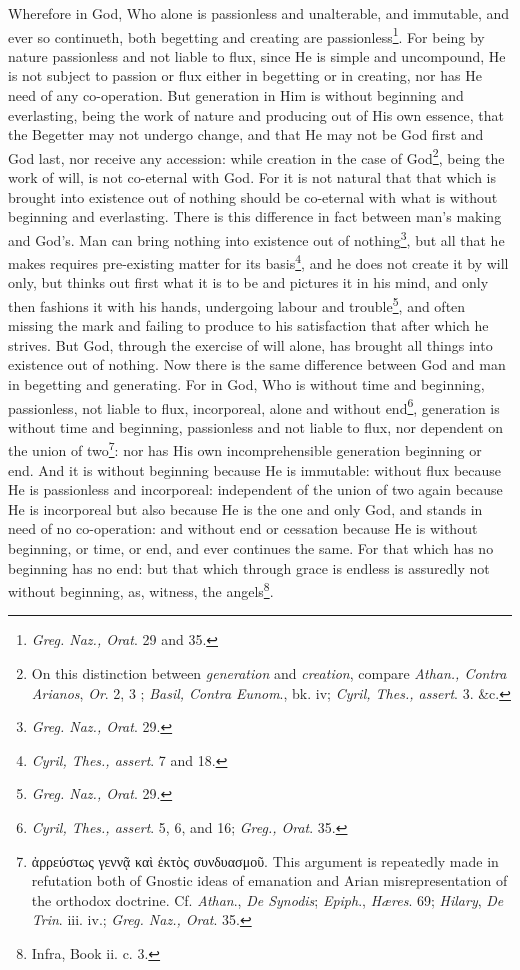 Wherefore in God, Who alone is passionless and unalterable, and immutable, and ever so continueth, both begetting and creating are passionless\footnote{\emph{Greg. Naz., Orat}. 29 and 35.}. For being by nature passionless and not liable to flux, since He is simple and uncompound, He is not subject to passion or flux either in begetting or in creating, nor has He need of any co-operation. But generation in Him is without beginning and everlasting, being the work of nature and producing out of His own essence, that the Begetter may not undergo change, and that He may not be God first and God last, nor receive any accession: while creation in the case of God\footnote{On this distinction between \emph{generation }and \emph{creation}, compare \emph{Athan., Contra Arianos}, \emph{Or}. 2, 3 ; \emph{Basil, Contra Eunom}., bk. iv; \emph{Cyril, Thes., assert}. 3. \&c.}, being the work of will, is not co-eternal with God. For it is not natural that that which is brought into existence out of nothing should be co-eternal with what is without beginning and everlasting. There is this difference in fact between man’s making and God’s. Man can bring nothing into existence out of nothing\footnote{\emph{Greg. Naz., Orat}. 29.}, but all that he makes requires pre-existing matter for its basis\footnote{\emph{Cyril, Thes., assert}. 7 and 18.}, and he does not create it by will only, but thinks out first what it is to be and pictures it in his mind, and only then fashions it with his hands, undergoing labour and trouble\footnote{\emph{Greg. Naz., Orat}. 29.}, and often missing the mark and failing to produce to his satisfaction that after which he strives. But God, through the exercise of will alone, has brought all things into existence out of nothing. Now there is the same difference between God and man in begetting and generating. For in God, Who is without time and beginning, passionless, not liable to flux, incorporeal, alone and without end\footnote{\emph{Cyril, Thes., assert}. 5, 6, and 16; \emph{Greg., Orat}. 35.}, generation is without time and beginning, passionless and not liable to flux, nor dependent on the union of two\footnote{\textgreek{ἀρρεύστως γεννᾷ καὶ ἐκτὸς συνδυασμοῦ}. This argument is repeatedly made in refutation both of Gnostic ideas of emanation and Arian misrepresentation of the orthodox doctrine. Cf. \emph{Athan}., \emph{De Synodis}; \emph{Epiph}., \emph{Hæres}. 69; \emph{Hilary}, \emph{De Trin}. iii. iv.; \emph{Greg. Naz., Orat}. 35.}: nor has His own incomprehensible generation beginning or end. And it is without beginning because He is immutable: without flux because He is passionless and incorporeal: independent of the union of two again because He is incorporeal but also because He is the one and only God, and stands in need of no co-operation: and without end or cessation because He is without beginning, or time, or end, and ever continues the same. For that which has no beginning has no end: but that which through grace is endless is assuredly not without beginning, as, witness, the angels\footnote{Infra, Book ii. c. 3.}.

